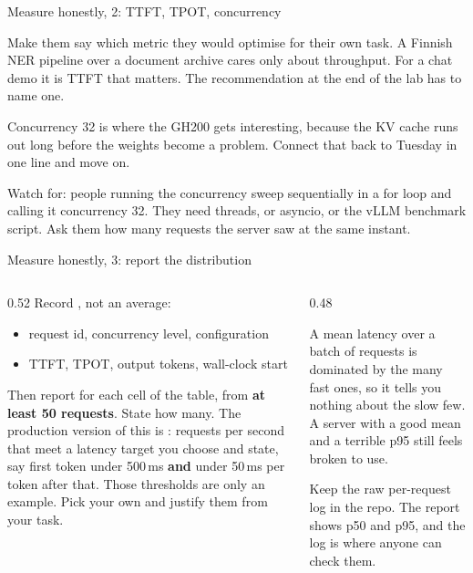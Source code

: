 \documentclass[aspectratio=169,10pt]{beamer}
\begin{document}
\begin{frame}[shrink=12]{Measure honestly, 2: TTFT, TPOT, concurrency}
{  Make them say which metric they would optimise for their own task. A Finnish
  NER pipeline over a document archive cares only about throughput. For a chat
  demo it is TTFT that matters. The recommendation at the end of the lab has to
  name one.

  Concurrency 32 is where the GH200 gets interesting, because the KV cache runs
  out long before the weights become a problem. Connect that back to Tuesday in
  one line and move on.

  Watch for: people running the concurrency sweep sequentially in a for loop
  and calling it concurrency 32. They need threads, or asyncio, or the vLLM
  benchmark script. Ask them how many requests the server saw at the same
  instant.}
\end{frame}

\begin{frame}{Measure honestly, 3: report the distribution}
  \begin{columns}[T]
    \begin{column}{0.52\textwidth}
      Record , not an average:
      \vspace{0.3em}
      \begin{itemize}
        \item request id, concurrency level, configuration
        \item TTFT, TPOT, output tokens, wall-clock start
      \end{itemize}
      \vspace{0.5em}
      Then report  for each cell of the table, from
      \textbf{at least 50 requests}. State how many.
      \vspace{0.5em}
      The production version of this is : requests per second that
      meet a latency target you choose and state, say first token under
      500\,ms \textbf{and} under 50\,ms per token after that.
      \vspace{0.3em}
      \small Those thresholds are only an example. Pick your own and justify
      them from your task.
    \end{column}
    \begin{column}{0.48\textwidth}
      \begin{gotcha}
        A mean latency over a batch of requests is dominated by the many fast
        ones, so it tells you nothing about the slow few.
        \vspace{0.3em}
        A server with a good mean and a terrible p95 still feels broken to use.
      \end{gotcha}
      \vspace{0.4em}
      \small
      Keep the raw per-request log in the repo. The report shows p50 and p95,
      and the log is where anyone can check them.
    \end{column}
  \end{columns}
\end{frame}
\end{document}
